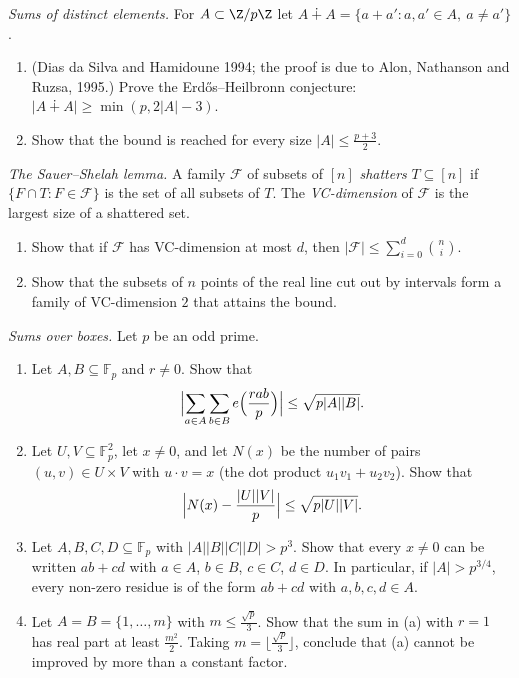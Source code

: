 \begin{exercise}[$\star\star\star$]\label{pb:erdosheil}
\emph{Sums of distinct elements.} For $A\subset\Z/p\Z$ let $A\dotplus A=\{a+a':a,a'\in A,\ a\ne a'\}$.
\begin{enumerate}[label=(\alph*)]
\item (Dias da Silva and Hamidoune 1994; the proof is due to Alon, Nathanson and Ruzsa, 1995.) Prove the Erdős--Heilbronn
conjecture: $|A\dotplus A|\ge\min(p,2|A|-3)$.
\item Show that the bound is reached for every size $|A|\le\frac{p+3}2$.
\end{enumerate}
\end{exercise}

\begin{exercise}[$\star\star$]\label{pb:sauer}
\emph{The Sauer--Shelah lemma.} A family $\mathcal F$ of subsets of $[n]$ \emph{shatters} $T\subseteq[n]$ if $\{F\cap T:F\in\mathcal F\}$ is the set of
all subsets of $T$. The \emph{VC-dimension} of $\mathcal F$ is the largest size of a shattered set.
\begin{enumerate}[label=(\alph*)]
\item Show that if $\mathcal F$ has VC-dimension at most $d$, then $|\mathcal F|\le\sum_{i=0}^d\binom ni$.
\item Show that the subsets of $n$ points of the real line cut out by intervals form a family of VC-dimension $2$ that attains the
bound.
\end{enumerate}
\end{exercise}

\begin{exercise}[$\star\star$]\label{pb:bilinear}
\emph{Sums over boxes.} Let $p$ be an odd prime.
\begin{enumerate}[label=(\alph*)]
\item Let $A,B\subseteq\mathbb F_p$ and $r\ne0$. Show that
\[
\Bigl|\sum_{a\in A}\sum_{b\in B}e\Bigl(\frac{rab}p\Bigr)\Bigr|\le\sqrt{p|A||B|}.
\]
\item Let $U,V\subseteq\mathbb F_p^2$, let $x\ne0$, and let $N(x)$ be the number of pairs $(u,v)\in U\times V$ with $u\cdot v=x$ (the dot
product $u_1v_1+u_2v_2$). Show that
\[
\Bigl|N(x)-\frac{|U||V|}p\Bigr|\le\sqrt{p|U||V|}.
\]
\item Let $A,B,C,D\subseteq\mathbb F_p$ with $|A||B||C||D|>p^3$. Show that every $x\ne0$ can be written $ab+cd$ with $a\in A$, $b\in B$,
$c\in C$, $d\in D$. In particular, if $|A|>p^{3/4}$, every non-zero residue is of the form $ab+cd$ with $a,b,c,d\in A$.
\item Let $A=B=\{1,\dots,m\}$ with $m\le\frac{\sqrt p}3$. Show that the sum in (a) with $r=1$ has real part at least $\frac{m^2}2$. Taking
$m=\lfloor\frac{\sqrt p}3\rfloor$, conclude that (a) cannot be improved by more than a constant factor.
\end{enumerate}
\end{exercise}

